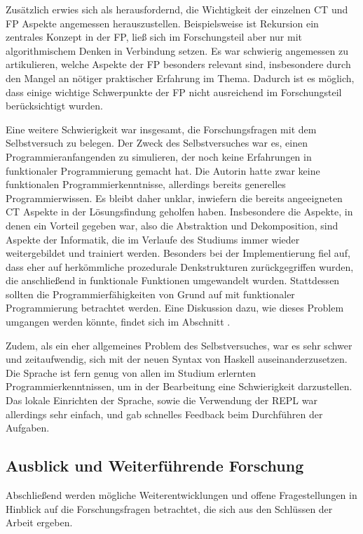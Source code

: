 Zusätzlich erwies sich als herausfordernd, die Wichtigkeit der einzelnen CT und FP Aspekte angemessen herauszustellen. Beispielsweise ist Rekursion ein zentrales Konzept in der FP, ließ sich im Forschungsteil aber nur mit algorithmischem Denken in Verbindung setzen. Es war schwierig angemessen zu artikulieren, welche Aspekte der FP besonders relevant sind, insbesondere durch den Mangel an nötiger praktischer Erfahrung im Thema. Dadurch ist es möglich, dass einige wichtige Schwerpunkte der FP nicht ausreichend im Forschungsteil berücksichtigt wurden.

Eine weitere Schwierigkeit war insgesamt, die Forschungsfragen mit dem Selbstversuch zu belegen. Der Zweck des Selbstversuches war es, einen Programmieranfangenden zu simulieren, der noch keine Erfahrungen in funktionaler Programmierung gemacht hat. Die Autorin hatte zwar keine funktionalen Programmierkenntnisse, allerdings bereits generelles Programmierwissen. Es bleibt daher unklar, inwiefern die bereits angeeigneten CT Aspekte in der Lösungsfindung geholfen haben. Insbesondere die Aspekte, in denen ein Vorteil gegeben war, also die Abstraktion und Dekomposition, sind Aspekte der Informatik, die im Verlaufe des Studiums immer wieder weitergebildet und trainiert werden.
Besonders bei der Implementierung fiel auf, dass eher auf herkömmliche prozedurale Denkstrukturen zurückgegriffen wurden, die anschließend in funktionale Funktionen umgewandelt wurden.
Stattdessen sollten die Programmierfähigkeiten von Grund auf mit funktionaler Programmierung betrachtet werden. Eine Diskussion dazu, wie dieses Problem umgangen werden könnte, findet sich im Abschnitt .

Zudem, als ein eher allgemeines Problem des Selbstversuches, war es sehr schwer und zeitaufwendig, sich mit der neuen Syntax von Haskell auseinanderzusetzen. Die Sprache ist fern genug von allen im Studium erlernten Programmierkenntnissen, um in der Bearbeitung eine Schwierigkeit darzustellen.
Das lokale Einrichten der Sprache, sowie die Verwendung der REPL war allerdings sehr einfach, und gab schnelles Feedback beim Durchführen der Aufgaben.

\subsection{Ausblick und Weiterführende Forschung}\label{sec:future}
Abschließend werden mögliche Weiterentwicklungen und offene Fragestellungen in Hinblick auf die Forschungsfragen betrachtet, die sich aus den Schlüssen der Arbeit ergeben.

